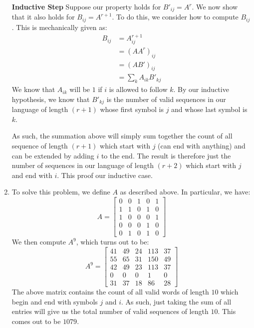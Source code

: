 \documentclass[12pt]{exam}
\begin{document}
\begin{questions}
\begin{solution}
\begin{enumerate}[label=(\alph*)]
      \textbf{Inductive Step}
      Suppose our property holds for $B'_{ij} = A^r$. We now show that it also holds for $B_{ij} = A^{r+1}$. To do this, we consider how to compute $B_{ij}$. This is mechanically given as:
      \begin{align*}
        B_{ij} &= A^{r+1}_{ij} \\
        &= (A A^{r})_{ij} \\
        &= (A B')_{ij} \\
        &= \sum_{k} A_{ik}B'_{kj} 
      \end{align*}
      We know that $A_{ik}$ will be $1$ if $i$ is allowed to follow $k$. By our inductive hypothesis, we know that $B'_{kj}$ is the number of valid sequences in our language of length $(r + 1)$ whose first symbol is $j$ and whose last symbol is $k$. 

      As such, the summation above will simply sum together the count of all sequence of length $(r+1)$ which start with $j$ (can end with anything) and can be extended by adding $i$ to the end. The result is therefore just the number of sequences in our language of length $(r+ 2)$ which start with $j$ and end with $i$. This proof our inductive case.

    \item 
      To solve this problem, we define $A$ as described above. In particular, we have:
      $$
      A = \begin{bmatrix}
        0 & 0 & 1 & 0 & 1 \\
        1 & 1 & 0 & 1 & 0 \\
        1 & 0 & 0 & 0 & 1 \\
        0 & 0 & 0 & 1 & 0 \\
        0 & 1 & 0 & 1 & 0
      \end{bmatrix}
      $$
      We then compute $A^9$, which turns out to be:
      $$
      A^9 = \begin{bmatrix}
        41 & 49 & 24 & 113 & 37 \\
        55 & 65 & 31 & 150 & 49 \\
        42 & 49 & 23 & 113 & 37 \\
        0 & 0 & 0 & 1 & 0 \\
        31 & 37 & 18 & 86 & 28
      \end{bmatrix}
      $$
      The above matrix contains the count of all valid words of length $10$ which begin and end with symbols $j$ and $i$. As such, just taking the sum of all entries will give us the total number of valid sequences of length $10$. This comes out to be $1079$.


\end{enumerate}
\end{solution}
\end{questions}
\end{document}
